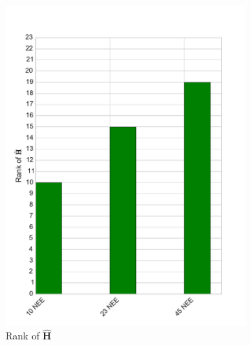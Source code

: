 \begin{figure}[ht]
    \centering
    \begin{subfigure}[b]{0.4\textwidth}
        \includegraphics[width=\textwidth]{chapter/chapter5/dalec2_obsrank.pdf}
        \caption{Rank of $\hat{\textbf{H}}$}
        \label{chap5:fig:D2_observabilityrank}
    \end{subfigure}%
    \begin{subfigure}[b]{0.4\textwidth}

\end{subfigure}
\end{figure}

